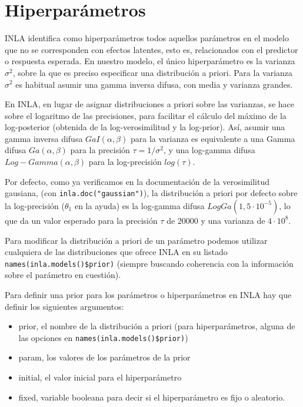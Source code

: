\documentclass[
]{book}
\providecommand{\tightlist}{%
  \setlength{\itemsep}{0pt}\setlength{\parskip}{0pt}}
\begin{document}
\hypertarget{hiperparuxe1metros}{%
\section{Hiperparámetros}\label{hiperparuxe1metros}}

INLA identifica como hiperparámetros todos aquellos parámetros en el modelo que no se corresponden con efectos latentes, esto es, relacionados con el predictor o respuesta esperada. En nuestro modelo, el único hiperparámetro es la varianza \(\sigma^2\), sobre la que es preciso especificar una distribución a priori. Para la varianza \(\sigma^2\) es habitual asumir una gamma inversa difusa, con media y varianza grandes.

En INLA, en lugar de asignar distribuciones a priori sobre las
varianzas, se hace sobre el logaritmo de las precisiones, para facilitar
el cálculo del máximo de la log-posterior (obtenida de la
log-verosimilitud y la log-prior). Así, asumir una gamma inversa difusa
\(GaI(\alpha,\beta)\) para la varianza es equivalente a una Gamma difusa
\(Ga(\alpha,\beta)\) para la precisión \(\tau=1/\sigma^2\), y una
log-gamma difusa \(Log-Gamma(\alpha,\beta)\) para la log-precisión
\(log(\tau)\).

Por defecto, como ya verificamos en la documentación de la verosimilitud gausiana, (con \texttt{inla.doc("gaussian")}), la distribución a priori por defecto sobre la log-precisión (\(\theta_1\) en la ayuda) es la log-gamma difusa \(LogGa(1,5\cdot 10^{-5})\), lo que da un valor esperado para la precisión \(\tau\) de 20000 y una varianza de \(4\cdot 10^8\).

Para modificar la distribución a priori de un parámetro podemos utilizar cualquiera de las distribuciones que ofrece INLA en su listado \texttt{names(inla.models()\$prior)} (siempre buscando coherencia con la información sobre el parámetro en cuestión).

Para definir una prior para los parámetros o hiperparámetros en INLA hay
que definir los siguientes argumentos:

\begin{itemize}
\tightlist
\item
  prior, el nombre de la distribución a priori (para hiperparámetros, alguna de las opciones en \texttt{names(inla.models()\$prior)})
\item
  param, los valores de los parámetros de la prior
\item
  initial, el valor inicial para el hiperparámetro
\item
  fixed, variable booleana para decir si el hiperparámetro es fijo o aleatorio.
\end{itemize}
\end{document}
